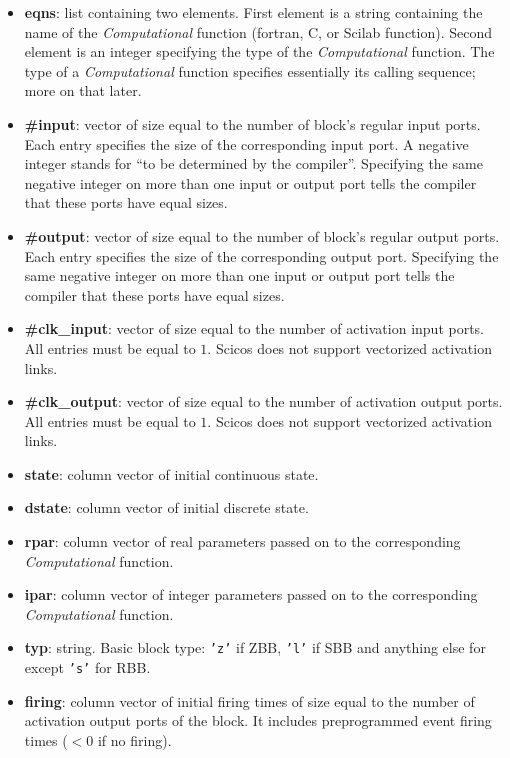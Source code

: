 \documentclass{article}
\newcommand{\computational}{{\em Computational }}
\begin{document}
\begin{itemize}
\item \textbf{eqns}: \label{eqns} list containing two elements. First element
is a string containing 
the name of the \computational function (fortran, C, or Scilab
function). Second element 
is an integer specifying the type of the \computational function. The
type of a \computational function specifies essentially its calling
sequence; more on that later. 
\item \textbf{\#input}: vector of size equal to the number of block's regular
input ports. Each entry specifies the size of the corresponding input
port. A negative integer stands for  ``to be determined by the
compiler''. Specifying the same negative integer on 
more than one input or output port tells the compiler that these ports have
equal sizes. 
\item \textbf{\#output}: vector of size equal to the number of block's regular
output ports. Each entry specifies the size of the corresponding
output port. Specifying the same negative integer on 
more than one input or output port tells the compiler that these ports have
equal sizes. 
\item \textbf{\#clk\_input}: vector of size equal to the number 
of activation input ports. All entries
must be equal to $1$. Scicos does not support vectorized activation links.

\item \textbf{\#clk\_output}: vector of size equal to the 
number of activation output ports. All entries
must be equal to $1$. Scicos does not support vectorized activation links.

\item \textbf{state}: column vector of initial continuous state.
\item \textbf{dstate}: column vector of initial discrete state.
\item \textbf{rpar}: column vector of real parameters passed on to the corresponding
\computational function.
\item \textbf{ipar}: column vector of integer parameters passed on to the
corresponding \computational function.
\item \textbf{typ}: string. Basic block type: {\tt 'z'} if ZBB, 
{\tt 'l'} if
SBB and anything else for except {\tt 's'} for RBB.
\item \textbf{firing}: column vector of initial firing times of size  equal to
the number of activation output ports of the block. It includes
preprogrammed event firing times ($<$0 if no firing). 


\end{itemize}
\end{document}
